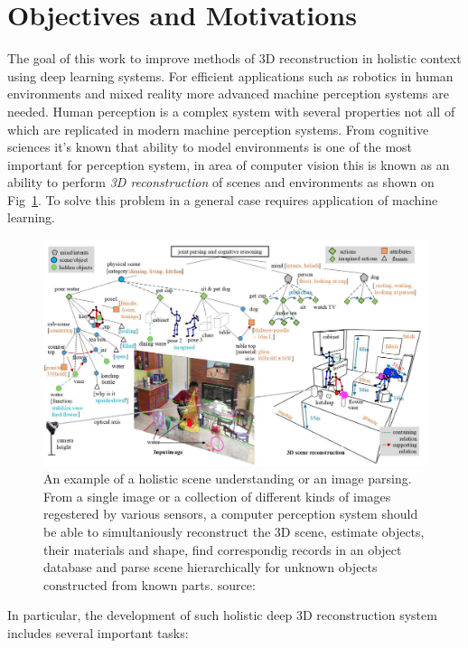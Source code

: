 \section{Objectives and Motivations}

The goal of this work to improve methods of 3D reconstruction in holistic context using deep learning systems. For efficient applications such as robotics in human environments and mixed reality more advanced machine perception systems are needed. Human perception is a complex system with several properties not all of which are replicated in modern machine perception systems. From cognitive sciences it's known that ability to model environments is one of the most important for perception system, in area of computer vision this is known as an ability to perform \textit{3D reconstruction} of scenes and environments as shown on Fig~\ref{fig:holistic_reconstruction}. To solve this problem in a general case requires application of machine learning.

\begin{figure}
	\centering
    \includegraphics[width=\textwidth]{Figures/holistic_scene_reconstruction.png}
    \caption{An example of a holistic scene understanding or an image parsing. From a single image or a collection of different kinds of images regestered by various sensors, a computer perception system should be able to simultaniously reconstruct the 3D scene, estimate objects, their materials and shape, find correspondig records in an object database and parse scene hierarchically for unknown objects constructed from known parts. source: \cite{zhu2020dark}}
    \label{fig:holistic_reconstruction}
\end{figure}

In particular, the development of such holistic deep 3D reconstruction system includes several important tasks:

